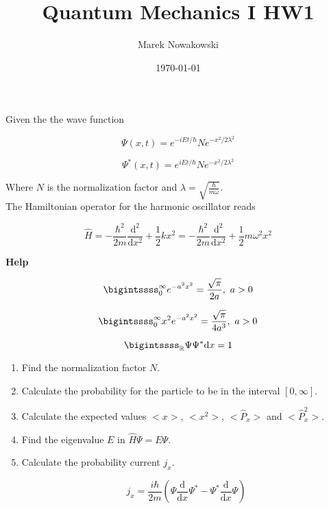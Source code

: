 \documentclass[11pt,letterpaper]{article}%
\title{\textbf{Quantum Mechanics I HW1}}
\author{Marek Nowakowski}
\date{\today}
\newcommand{\dx}{\mathrm{d}x}
\begin{document}
\maketitle

Given the the wave function

\begin{equation}
\label{wavefunc}
\Psi(x,t) = e^{-iEt/\hbar}Ne^{-x^2/2\lambda^2}
\end{equation}

\begin{equation}
\label{wavefunc*}
\Psi^*(x,t) = e^{iEt/\hbar}Ne^{-x^2/2\lambda^2}
\end{equation}

Where $N$ is the normalization factor and $\lambda = \sqrt{\frac{\hbar}{m\omega}}$.\\The Hamiltonian operator for the harmonic oscillator reads

\begin{equation}
\label{hamil}
\hat{H} = -\frac{\hbar^2}{2m}\frac{\mathrm{d}^2}{\mathrm{d}x^2} + \frac{1}{2}kx^2 = -\frac{\hbar^2}{2m}\frac{\mathrm{d}^2}{\mathrm{d}x^2} + \frac{1}{2}m\omega^2x^2
\end{equation}

\textbf{Help}

\begin{equation}
\label{help1}
\bigintssss_0^{\infty}e^{-a^2x^2} = \frac{\sqrt{\pi}}{2a},\ a>0
\end{equation}

\begin{equation}
\label{help2}
\bigintssss_0^{\infty}x^2e^{-a^2x^2} = \frac{\sqrt{\pi}}{4a^3},\ a>0
\end{equation}

\begin{equation}
\label{prob}
\bigintssss_{\mathbb{R}}\Psi\Psi^*\dx = 1
\end{equation}

\begin{enumerate}
[label=\Large{\textbf{\arabic*.}}]
\item{
Find the normalization factor $N$.
}

\item{
Calculate the probability for the particle to be in the interval $[0,\infty]$.
}

\item{
Calculate the expected values $\big<x\big>$, $\big<x^2\big>$, $\big<\hat{P}_x\big>$ and $\big<\hat{P}_x^2\big>$.
}

\item{
Find the eigenvalue $E$ in $\hat{H}\Psi = E\Psi$.
}

\item
{
Calculate the probability current $j_x$.

\begin{equation}
\label{p5:1}
j_x = \frac{i\hbar}{2m}\left(\Psi \frac{\mathrm{d}}{\dx}\Psi^* - \Psi^*\frac{\mathrm{d}}{\dx}\Psi \right)
\end{equation}
}

\end{enumerate}
\end{document}
